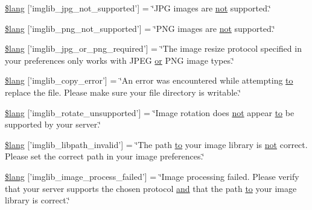 \begin{DoxyCompactItemize}
\item 
\hyperlink{imglib__lang_8php_a4acdc927c172bab1370b2897c667c552}{\$lang} \mbox{[}'imglib\-\_\-jpg\-\_\-not\-\_\-supported'\mbox{]} = \char`\"{}J\-P\-G images are \hyperlink{mathquill_8js_ac1e1ab538c27d68cc2cbafea74e7412c}{not} supported.\char`\"{}
\item 
\hyperlink{imglib__lang_8php_a0b7ea2e2fbd03eb72fe9d969adb643dd}{\$lang} \mbox{[}'imglib\-\_\-png\-\_\-not\-\_\-supported'\mbox{]} = \char`\"{}P\-N\-G images are \hyperlink{mathquill_8js_ac1e1ab538c27d68cc2cbafea74e7412c}{not} supported.\char`\"{}
\item 
\hyperlink{imglib__lang_8php_a2878e2b878871cd8010970f865d70e71}{\$lang} \mbox{[}'imglib\-\_\-jpg\-\_\-or\-\_\-png\-\_\-required'\mbox{]} = \char`\"{}The image resize protocol specified in your preferences only works with J\-P\-E\-G \hyperlink{mathquill_8js_a6fdf1c439b25d95597e99492b728acaa}{or} P\-N\-G image types.\char`\"{}
\item 
\hyperlink{imglib__lang_8php_a012b6a0d2b3a8ef934e8783d2fbd6535}{\$lang} \mbox{[}'imglib\-\_\-copy\-\_\-error'\mbox{]} = \char`\"{}An error was encountered while attempting \hyperlink{mathquill_8js_ae3622f38202b3532cd6eae25726945f8}{to} replace the file. Please make sure your file directory is writable.\char`\"{}
\item 
\hyperlink{imglib__lang_8php_ab1c77c6b58fc5bf8e979ab4237ec87e7}{\$lang} \mbox{[}'imglib\-\_\-rotate\-\_\-unsupported'\mbox{]} = \char`\"{}Image rotation does \hyperlink{mathquill_8js_ac1e1ab538c27d68cc2cbafea74e7412c}{not} appear \hyperlink{mathquill_8js_ae3622f38202b3532cd6eae25726945f8}{to} be supported by your server.\char`\"{}
\item 
\hyperlink{imglib__lang_8php_a8f190c17a02ca89334c8bf0a04333f65}{\$lang} \mbox{[}'imglib\-\_\-libpath\-\_\-invalid'\mbox{]} = \char`\"{}The path \hyperlink{mathquill_8js_ae3622f38202b3532cd6eae25726945f8}{to} your image library is \hyperlink{mathquill_8js_ac1e1ab538c27d68cc2cbafea74e7412c}{not} correct. Please set the correct path in your image preferences.\char`\"{}
\item 
\hyperlink{imglib__lang_8php_a9ac6659eb97dd12e5c714cc9635cf22e}{\$lang} \mbox{[}'imglib\-\_\-image\-\_\-process\-\_\-failed'\mbox{]} = \char`\"{}Image processing failed. Please verify that your server supports the chosen protocol \hyperlink{mathquill_8js_ac39c488ee3bd6d675c340966d33495a7}{and} that the path \hyperlink{mathquill_8js_ae3622f38202b3532cd6eae25726945f8}{to} your image library is correct.\char`\"{}
\item 

\end{DoxyCompactItemize}
